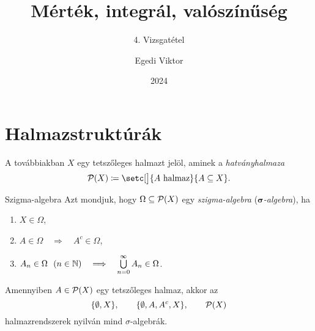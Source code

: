 \documentclass[
]{elteikthesis}[2024/04/26]
\title{Mérték, integrál, valószínűség} %
\subtitle{4. Vizsgatétel}
\date{2024} %
\author{Egedi Viktor}
\affiliation{egyetemi tanár} %
\begin{document}
	
	
	\section{Halmazstruktúrák}
	
	A továbbiakban \( X \) egy tetszőleges halmazt jelöl, aminek a \emph{hatványhalmaza}
	\[
		\powerset{X} \coloneq \setc[\big]{A \text{ halmaz}}{A \subseteq X}.
	\]
	
	\begin{definition}{Szigma-algebra}{}
		Azt mondjuk, hogy \( \Omega \subseteq \mathcal{P}( X ) \) egy \emph{szigma-algebra} 
		(\emph{\( \boldsymbol{\sigma} \)-algebra}), ha
		\begin{enumerate}[label={(\( \Sigma \)\arabic*)}, ref={\( \Sigma \)\arabic*.}]
			\item\label{ax:sigma-algebra-01}
			\( X \in \Omega \),
			
			\item\label{ax:sigma-algebra-02}
			\( A \in \Omega \quad \Longrightarrow \quad A^c \in \Omega \),
			
			\item\label{ax:sigma-algebra-03}
			\( A_n \in \Omega \ \ (n \in \mathbb{N}) 
			   \quad \Longrightarrow \quad 
			   \bigcup\limits_{n=0}^{\infty} A_n \in \Omega 
			\).
		\end{enumerate}
	\end{definition}
	
	\begin{example}
		Amennyiben \( A \in \mathcal{P}( X ) \) egy tetszőleges halmaz, akkor az
		\[
			\{ \emptyset, X \}, \qquad \{ \emptyset, A, A^c, X \}, \qquad \mathcal{P}( X )
		\]
		halmazrendszerek nyilván mind \( \sigma \)-algebrák. 
	\end{example}
	
\end{document}
